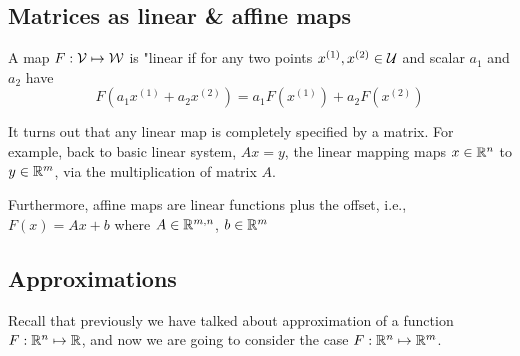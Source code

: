 \subsection{Matrices as linear \& affine maps}
A map $F:\cal{V}\mapsto\cal{W}$ is "linear if for any two points $x^{(1)}, x^{(2)}\in\cal{U}$ and scalar $a_1$ and $a_2$ have
$$F(a_1 x^{(1)} + a_2 x^{(2)}) = a_1 F(x^{(1)}) + a_2 F(x^{(2)})$$

It turns out that any linear map is completely specified by a matrix. For example, back to basic linear system, $Ax=y$, the linear mapping maps $x\in\mathbb{R}^n$ to $y\in\mathbb{R}^m$, via the multiplication of matrix $A$.

Furthermore, affine maps are linear functions plus the offset, i.e., $F(x) = Ax + b$ where $A\in \mathbb{R}^{m,n}$, $b\in \mathbb{R}^m$




\subsection{Approximations}


Recall that previously we have talked about approximation of a function $F:\mathbb{R}^{n}\mapsto\mathbb{R}$, and now we are going to consider the case $F:\mathbb{R}^{n}\mapsto\mathbb{R}^m$.


